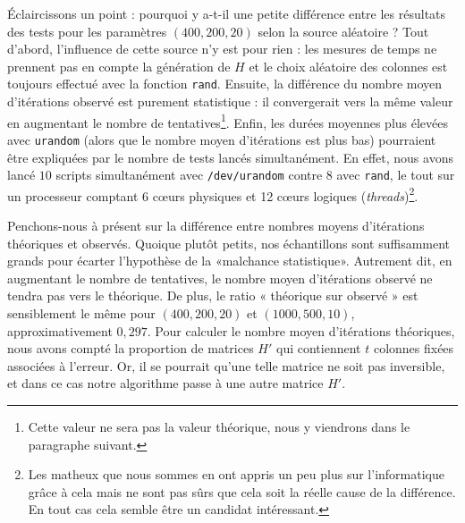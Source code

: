 \documentclass[11pt,a4paper]{article}
\begin{document}
Éclaircissons un point : pourquoi y a-t-il une petite différence entre les
résultats des tests pour les paramètres $(400, 200, 20)$ selon la source
aléatoire ?
Tout d'abord, l'influence de cette source n'y est pour rien : les mesures de
temps ne prennent pas en compte la génération de $H$ et le choix aléatoire des
colonnes est toujours effectué avec la fonction \texttt{rand}.
Ensuite, la différence du nombre moyen d'itérations observé est
purement statistique : il convergerait vers la même valeur en augmentant le
nombre de tentatives\footnote{Cette valeur ne sera pas la valeur théorique, nous
y viendrons dans le paragraphe suivant.}.
Enfin, les durées moyennes plus élevées avec \texttt{urandom} (alors que le
nombre moyen d'itérations est plus bas) pourraient être expliquées par le nombre
de tests lancés simultanément. En effet, nous avons lancé $10$ scripts
simultanément avec \texttt{/dev/urandom} contre $8$ avec \texttt{rand}, le tout
sur un processeur comptant 6 cœurs physiques et 12 cœurs logiques
(\emph{threads})\footnote{Les matheux que nous sommes en ont appris un peu plus
sur l'informatique grâce à cela mais ne sont pas sûrs que cela soit la réelle
cause de la différence. En tout cas cela semble être un candidat intéressant.}.

Penchons-nous à présent sur la différence entre nombres moyens d'itérations
théoriques et observés.
Quoique plutôt petits, nos échantillons sont suffisamment grands pour écarter
l'hypothèse de la «malchance statistique».
Autrement dit, en augmentant le nombre de tentatives, le nombre moyen
d'itérations observé ne tendra pas vers le théorique.
De plus, le ratio « théorique sur observé » est sensiblement le même pour 
$(400,200,20)$ et $(1000,500,10)$, approximativement $0,297$.
Pour calculer le nombre moyen d'itérations théoriques, nous avons compté la
proportion de matrices $H'$ qui contiennent $t$ colonnes fixées associées à
l'erreur. Or, il se pourrait qu'une telle matrice ne soit pas inversible, et
dans ce cas notre algorithme passe à une autre matrice $H'$.
\end{document}
